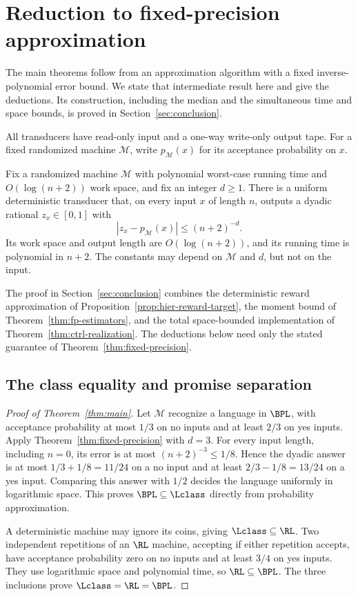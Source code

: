 \section{Reduction to fixed-precision approximation}
\label{sec:deduction}

The main theorems follow from an approximation algorithm with a fixed
inverse-polynomial error bound. We state that intermediate result here
and give the deductions. Its construction, including the median and
the simultaneous time and space bounds, is proved in
Section~\ref{sec:conclusion}.

All transducers have read-only input and a one-way write-only output
tape. For a fixed randomized machine $\mathcal M$, write
$p_{\mathcal M}(x)$ for its acceptance probability on $x$.

\begin{theorem}
\label{thm:fixed-precision}
Fix a randomized machine $\mathcal M$ with polynomial worst-case
running time and $O(\log(n+2))$ work space, and fix an integer $d\ge1$.
There is a uniform deterministic transducer that, on every input $x$
of length $n$, outputs a dyadic rational $z_x\in[0,1]$ with
\[
 |z_x-p_{\mathcal M}(x)|\le(n+2)^{-d}.
\]
Its work space and output length are $O(\log(n+2))$, and its running
time is polynomial in $n+2$. The constants may depend on
$\mathcal M$ and $d$, but not on the input.
\end{theorem}

The proof in Section~\ref{sec:conclusion} combines the deterministic
reward approximation of Proposition~\ref{prop:hier-reward-target},
the moment bound of Theorem~\ref{thm:fp-estimators}, and the total
space-bounded implementation of Theorem~\ref{thm:ctrl-realization}.
The deductions below need only the stated guarantee of
Theorem~\ref{thm:fixed-precision}.

\subsection{The class equality and promise separation}

\begin{proof}[Proof of Theorem~\ref{thm:main}]
Let $\mathcal M$ recognize a language in $\BPL$, with acceptance
probability at most $1/3$ on no inputs and at least $2/3$ on yes
inputs. Apply Theorem~\ref{thm:fixed-precision} with $d=3$.
For every input length, including $n=0$, its error is at most
$(n+2)^{-3}\le1/8$. Hence the dyadic answer is at most
$1/3+1/8=11/24$ on a no input and at least
$2/3-1/8=13/24$ on a yes input. Comparing this answer with $1/2$
decides the language uniformly in logarithmic space. This proves
$\BPL\subseteq\Lclass$ directly from probability approximation.

A deterministic machine may ignore its coins, giving
$\Lclass\subseteq\RL$. Two independent repetitions of an $\RL$
machine, accepting if either repetition accepts, have acceptance
probability zero on no inputs and at least $3/4$ on yes inputs.
They use logarithmic space and polynomial time, so
$\RL\subseteq\BPL$. The three inclusions prove
$\Lclass=\RL=\BPL$.
\end{proof}

